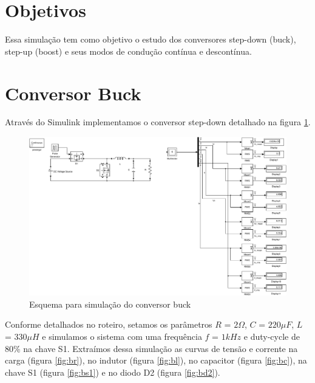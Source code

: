 \documentclass{article}
\begin{document}


\onehalfspacing
\section{Objetivos}
	Essa simulação tem como objetivo o estudo dos conversores step-down (buck), step-up (boost) e seus modos de condução contínua e descontínua.
	 
\section{Conversor Buck}
Através do Simulink implementamos o conversor step-down detalhado na figura \ref{fig:bsim}.
\begin{figure}[H]
	\centering
	\includegraphics[width=\linewidth]{matlab/buck/bsim}
	\caption{Esquema para simulação do conversor buck}
	\label{fig:bsim}
\end{figure}
Conforme detalhados no roteiro, setamos os parâmetros $R$ = $2\Omega$, $C$ = $220\mu F$, $L$ = $330\mu H$ e simulamos o sistema com uma frequência $f$ = $1kHz$ e duty-cycle de 80\% na chave S1.
Extraímos dessa simulação as curvas de tensão e corrente na carga (figura \ref{fig:br}), no indutor (figura \ref{fig:bl}), no capacitor (figura \ref{fig:bc}), na chave S1 (figura \ref{fig:bs1}) e no diodo D2 (figura \ref{fig:bd2}).
\end{document}
